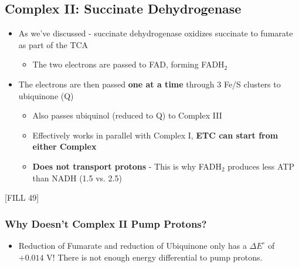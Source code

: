 \documentclass[10pt]{article}
\begin{document}
\subsection*{Complex II: Succinate Dehydrogenase}
\begin{itemize}
	\item As we've discussed - succinate dehydrogenase oxidizes succinate to fumarate as part of the TCA
	\begin{itemize}
        \item The two electrons are passed to FAD, forming FADH$_2$
    \end{itemize}
    \item The electrons are then passed \textbf{one at a time} through 3 Fe/S clusters to ubiquinone (Q)
    \begin{itemize}
        \item Also passes ubiquinol (reduced to Q) to Complex III
        \item Effectively works in parallel with Complex I, \textbf{ETC can start from either Complex}
        \item \textbf{Does not transport protons} - This is why FADH$_2$ produces less ATP than NADH (1.5 vs. 2.5)
    \end{itemize}
\end{itemize}
\begin{center} 
	[FILL 49]
\end{center}

\subsubsection*{Why Doesn't Complex II Pump Protons?}
\begin{itemize}
	\item Reduction of Fumarate and reduction of Ubiquinone only has a $\Delta E^\circ$ of $+0.014$ V!  There is not enough energy differential to pump protons.
\end{itemize}
\end{document}
